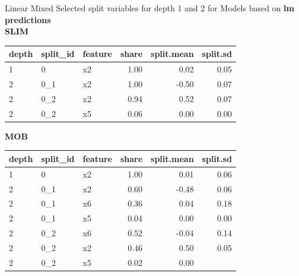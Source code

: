 \documentclass[9pt, xcolor=table]{beamer}
\begin{document}
\begin{frame}{Linear Mixed}
Selected split variables for depth 1 and 2 for Models based on \textbf{lm predictions}\\
\textbf{SLIM}

\begin{table}[ht]
\centering
\begin{tabular}{lllrrr}
  \hline
depth & split\_id & feature & share & split.mean & split.sd \\ 
  \hline
1 & 0 & x2 & 1.00 & 0.02 & 0.05 \\ 
  2 & 0\_1 & x2 & 1.00 & -0.50 & 0.07 \\ 
  2 & 0\_2 & x2 & 0.94 & 0.52 & 0.07 \\ 
  2 & 0\_2 & x5 & 0.06 & 0.00 & 0.00 \\ 
   \hline
\end{tabular}
\end{table}

\textbf{MOB}
\begin{table}[ht]
\centering
\begin{tabular}{lllrrr}
  \hline
depth & split\_id & feature & share & split.mean & split.sd \\ 
  \hline
1 & 0 & x2 & 1.00 & 0.01 & 0.06 \\ 
  2 & 0\_1 & x2 & 0.60 & -0.48 & 0.06 \\ 
  2 & 0\_1 & x6 & 0.36 & 0.04 & 0.18 \\ 
  2 & 0\_1 & x5 & 0.04 & 0.00 & 0.00 \\ 
  2 & 0\_2 & x6 & 0.52 & -0.04 & 0.14 \\ 
  2 & 0\_2 & x2 & 0.46 & 0.50 & 0.05 \\ 
  2 & 0\_2 & x5 & 0.02 & 0.00 &  \\ 
   \hline
\end{tabular}
\end{table}
\end{frame}
\end{document}
